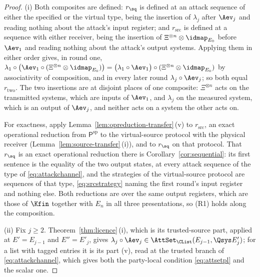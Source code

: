 \begin{proof}
(i) Both composites are defined: $r_{\sq}$ is defined at an attack sequence of
either the specified or the virtual type, being the insertion of $\lambda_j$
after $\Aev_j$ and reading nothing about the attack's input register; and
$r_{\mathrm{src}}$ is defined at a sequence with either receiver, being the
insertion of $\Xi^{\otimes n}\otimes\idmap_{E_0}$ before $\Aev_1$ and reading
nothing about the attack's output systems. Applying them in either order gives,
in round one,
$\lambda_1\circ\big(\Aev_1\circ(\Xi^{\otimes n}\otimes\idmap_{E_0})\big)
=\big(\lambda_1\circ\Aev_1\big)\circ(\Xi^{\otimes n}\otimes\idmap_{E_0})$ by
associativity of composition, and in every later round $\lambda_j\circ\Aev_j$;
so both equal $r_{\mathrm{two}}$. The two insertions are at disjoint places
of one composite: $\Xi^{\otimes n}$ acts on the transmitted systems, which are
inputs of $\Aev_1$, and $\lambda_j$ on the measured system, which is an output
of $\Aev_j$, and neither acts on a system the other acts on.

For exactness, apply Lemma~\ref{lem:opreduction-transfer}\,(v) to
$r_{\mathrm{src}}$, an exact operational reduction from
$\mathsf{P}^{\mathrm{sp}}$ to the virtual-source protocol with the physical
receiver (Lemma~\ref{lem:source-transfer}\,(i)), and to $r_{\sq}$ on that
protocol. That $r_{\sq}$ is an exact operational reduction there is
Corollary~\ref{cor:sequential}: its first sentence is the equality of the two
output states, at every attack sequence of the type of
\eqref{eq:attackchannel}, and the strategies of the virtual-source protocol are
sequences of that type, \eqref{eq:srcstrategy} naming the first round's input
register and nothing else. Both reductions are over the same output registers,
which are those of $\Kfin$ together with $E_n$ in all three presentations, so
(R1) holds along the composition.

(ii) Fix $j\ge2$. Theorem~\ref{thm:licence}\,(i), which is its trusted-source
part, applied at $E'=E_{j-1}$ and $E''=E'_j$, gives
$\lambda_j\circ\Aev_j\in\AttSet_{\CList}(E_{j-1},\Qsys E'_j)$; for a list with
tagged entries it is its part (v), read at the trusted branch of
\eqref{eq:attackchannel}, which gives both the party-local condition
\eqref{eq:attsetpl} and the scalar one.


\end{proof}
